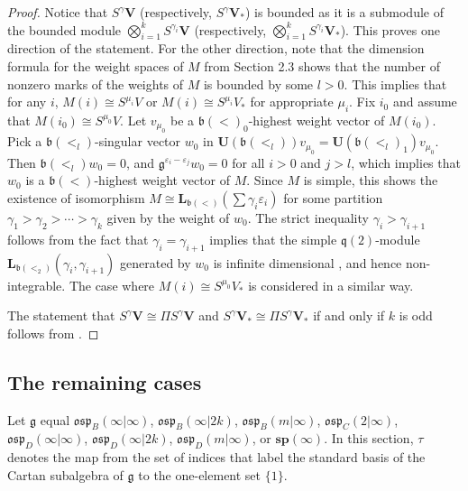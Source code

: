 \documentclass[12pt]{amsart}
\newcommand\g{\mathfrak{g}}
\newcommand\fq{\mathfrak{q}}
\newcommand\fh{\mathfrak{h}}
\newcommand\fb{\mathfrak{b}}
\newcommand\fosp{\mathfrak{osp}}
\newcommand\bV{\mathbf{V}}
\newcommand\bsp{\mathbf{sp}}
\newcommand\bU{\mathbf{U}}
\newcommand\bL{\mathbf{L}}
\DeclareMathOperator{\Supp}{Supp} %
\theoremstyle{plain}
\theoremstyle{definition}
\numberwithin{equation}{section}
\begin{document}
\begin{proof}
Notice that $S^\gamma \bV$ (respectively, $S^\gamma \bV_*$) is bounded as it is a submodule of the bounded module $\bigotimes_{i=1}^k S^{\gamma_i} \bV$ (respectively, $\bigotimes_{i=1}^k S^{\gamma_i} \bV_*$). This proves one direction of the statement. For the other direction, note that the dimension formula for the weight spaces of $M$ from Section 2.3 shows that the number of nonzero marks of the weights of $M$ is bounded by some $l>0$. This implies that for any $i$, $M(i)\cong S^{\mu_i} V$ or $M(i)\cong S^{\mu_i} V_*$ for appropriate $\mu_i$. Fix $i_0$ and assume that $ M(i_0) \cong S^{\mu_0} V$. Let $v_{\mu_0}$ be a $\fb(<)_0$-highest weight vector of $M(i_0)$. Pick a $\fb(<_l)$-singular vector $w_0$ in $\bU(\fb(<_l)) v_{\mu_0} = \bU(\fb(<_l)_1) v_{\mu_0}$. Then $\fb(<_l) w_0 =0$, and $\g^{\varepsilon_i - \varepsilon_{j}}w_0=0$ for all $i>0$ and $j > l$, which implies that $w_0$ is a $\fb(<)$-highest weight vector of $M$. Since $M$ is simple, this shows the existence of isomorphism $M\cong \bL_{\fb(<)} (\sum \gamma_i\varepsilon_i)$ for some partition $\gamma_1 > \gamma_2 > \cdots >\gamma_k$ given by the weight of $w_0$. The strict inequality $\gamma_i>\gamma_{i+1}$ follows from the fact that $\gamma_i = \gamma_{i+1}$ implies that the simple $\fq(2)$-module $\bL_{\fb(<_2)}(\gamma_i, \gamma_{i+1})$ generated by $w_0$ is infinite dimensional \cite{Pen86}, and hence non-integrable. The case where $M(i) \cong S^{\mu_{0}} V_* $ is considered in a similar way. 

The statement that $S^\gamma \bV\cong \Pi S^\gamma \bV$ and $S^\gamma \bV_*\cong \Pi S^\gamma \bV_*$ if and only if $k$ is odd follows from \cite[Proposition~4]{Pen86}.
\end{proof}

\subsection{The remaining cases}\label{sec:remaining.cases}
Let $\g$ equal $\fosp_B(\infty|\infty)$, $\fosp_B(\infty|2k)$, $\fosp_B(m|\infty)$, $\fosp_C(2|\infty)$, $\fosp_D(\infty|\infty)$, $\fosp_D(\infty|2k)$, $\fosp_D(m|\infty)$, or $\bsp(\infty)$. In this section, $\tau$ denotes the map from the set of indices that label the standard basis of the Cartan subalgebra of $\g$ to the one-element set $\{1\}$.
\end{document}
